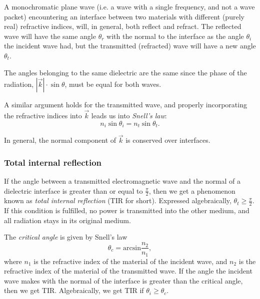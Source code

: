     A monochromatic plane wave (i.e. a wave with a single frequency, and not a wave packet) 
    encountering an interface between two materials with different (purely real) refractive indices, will, in general, both reflect and refract. 
    The reflected wave will have the same angle $\theta_r$ with the normal to the interface as the angle $\theta_i$ the incident wave had, 
    but the transmitted (refracted) wave will have a new angle $\theta_t$. 

    The angles belonging to the same dielectric are the same since the phase of the radiation, 
    $|\vec{k}|\cdot\sin\theta$, must be equal for both waves. 

    A similar argument holds for the transmitted wave, and properly incorporating the refractive indices into $\vec{k}$ leads us into
    \textit{Snell's law}:
    \begin{equation}
        n_i\sin\theta_i = n_t\sin\theta_t.
    \end{equation}

    In general, the normal component of $\vec{k}$ is conserved over interfaces.

    \subsubsection*{Total internal reflection}
        If the angle between a transmitted electromagnetic wave and the normal of a dielectric interface is greater than or equal to $\frac{\pi}{2}$, 
        then we get a phenomenon known as \textit{total internal reflection} (TIR for short). 
        Expressed algebraically, $\theta_t \geq \frac{\pi}{2}$.
        If this condition is fulfilled, no power is transmitted into the other medium, and all radiation stays in its original medium.

        The \textit{critical angle} is given by Snell's law
        \begin{equation}
            \theta_c = \text{arcsin}\frac{n_2}{n_1},
        \end{equation}
        where $n_1$ is the refractive index of the material of the incident wave, and $n_2$ is the refractive index of the material of the transmitted wave.
        If the angle the incident wave makes with the normal of the interface is greater than the critical angle, then we get TIR. 
        Algebraically, we get TIR if $\theta_i \geq \theta_c$. 
